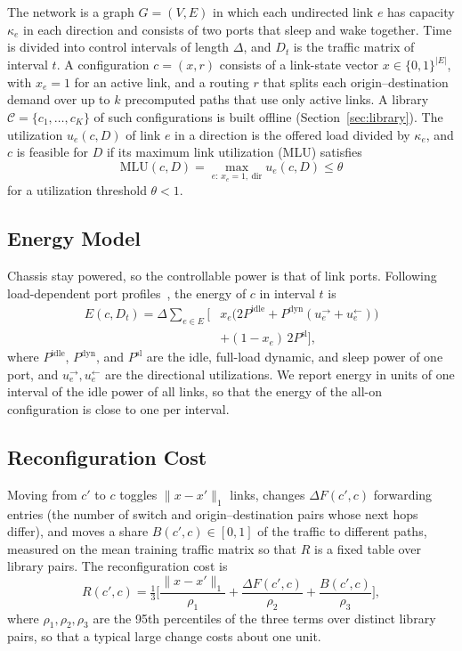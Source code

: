 \documentclass[5p,times]{elsarticle}
\begin{document}
The network is a graph $G=(V,E)$ in which each undirected link $e$ has capacity $\kappa_e$ in each direction and consists of two ports that sleep and wake together. Time is divided into control intervals of length $\Delta$, and $D_t$ is the traffic matrix of interval $t$. A configuration $c=(x,r)$ consists of a link-state vector $x\in\{0,1\}^{|E|}$, with $x_e=1$ for an active link, and a routing $r$ that splits each origin--destination demand over up to $k$ precomputed paths that use only active links. A library $\mathcal{C}=\{c_1,\dots,c_K\}$ of such configurations is built offline (Section~\ref{sec:library}). The utilization $u_e(c,D)$ of link $e$ in a direction is the offered load divided by $\kappa_e$, and $c$ is feasible for $D$ if its maximum link utilization (MLU) satisfies
\begin{equation}\label{eq:mlu}
\mathrm{MLU}(c,D)=\max_{e:\,x_e=1,\ \mathrm{dir}}u_e(c,D)\le\theta
\end{equation}
for a utilization threshold $\theta<1$.

\subsection{Energy Model}

Chassis stay powered, so the controllable power is that of link ports. Following load-dependent port profiles~\cite{restrepo2009energy,mahadevan2009power,vishwanath2014modeling}, the energy of $c$ in interval $t$ is
\begin{equation}\label{eq:energy}
\begin{split}E(c,D_t)=\Delta\sum_{e\in E}\Big[&x_e\big(2P^{\mathrm{idle}}+P^{\mathrm{dyn}}(u_e^{\rightarrow}+u_e^{\leftarrow})\big)\\
&+(1-x_e)\,2P^{\mathrm{sl}}\Big],\end{split}
\end{equation}
where $P^{\mathrm{idle}}$, $P^{\mathrm{dyn}}$, and $P^{\mathrm{sl}}$ are the idle, full-load dynamic, and sleep power of one port, and $u_e^{\rightarrow},u_e^{\leftarrow}$ are the directional utilizations. We report energy in units of one interval of the idle power of all links, so that the energy of the all-on configuration is close to one per interval.

\subsection{Reconfiguration Cost}

Moving from $c'$ to $c$ toggles $\|x-x'\|_1$ links, changes $\Delta F(c',c)$ forwarding entries (the number of switch and origin--destination pairs whose next hops differ), and moves a share $B(c',c)\in[0,1]$ of the traffic to different paths, measured on the mean training traffic matrix so that $R$ is a fixed table over library pairs. The reconfiguration cost is
\begin{equation}\label{eq:reconf}
R(c',c)=\tfrac13\Big[\frac{\|x-x'\|_1}{\rho_1}+\frac{\Delta F(c',c)}{\rho_2}+\frac{B(c',c)}{\rho_3}\Big],
\end{equation}
where $\rho_1,\rho_2,\rho_3$ are the 95th percentiles of the three terms over distinct library pairs, so that a typical large change costs about one unit.
\end{document}
